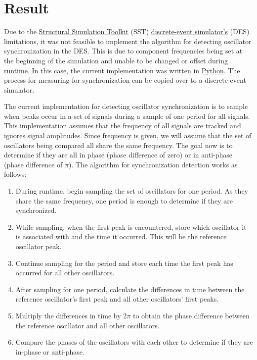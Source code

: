 \documentclass{article}
\begin{document}
\section{Result} %

Due to the \href{http://sst-simulator.org/}{Structural Simulation Toolkit} (SST) \href{https://en.wikipedia.org/wiki/Discrete-event_simulation}{discrete-event simulator's} (DES) limitations, it was not feasible to implement the algorithm for detecting oscillator synchronization in the DES. This is due to component frequencies being set at the beginning of the simulation and unable to be changed or offset during runtime. In this case, the current implementation was written in \href{https://www.python.org/about/}{Python}. The process for measuring for synchronization can be copied over to a discrete-event simulator.

The current implementation for detecting oscillator synchronization is to sample when peaks occur in a set of signals during a sample of one period for all signals. This implementation assumes that the frequency of all signals are tracked and ignores signal amplitudes. Since frequency is given, we will assume that the set of oscillators being compared all share the same frequency. The goal now is to determine if they are all in phase (phase difference of zero) or in anti-phase (phase difference of $\pi$). The algorithm for synchronization detection works as follows:

\begin{enumerate}
	\item During runtime, begin sampling the set of oscillators for one period. As they share the same frequency, one period is enough to determine if they are synchronized.
	\item While sampling, when the first peak is encountered, store which oscillator it is associated with and the time it occurred. This will be the reference oscillator peak.
	\item Continue sampling for the period and store each time the first peak has occurred for all other oscillators.
	\item After sampling for one period, calculate the differences in time between the reference oscillator's first peak and all other oscillators' first peaks.
	\item Multiply the differences in time by 2$\pi$ to obtain the phase difference between the reference oscillator and all other oscillators.
	\item Compare the phases of the oscillators with each other to determine if they are in-phase or anti-phase.
\end{enumerate}
\end{document}
